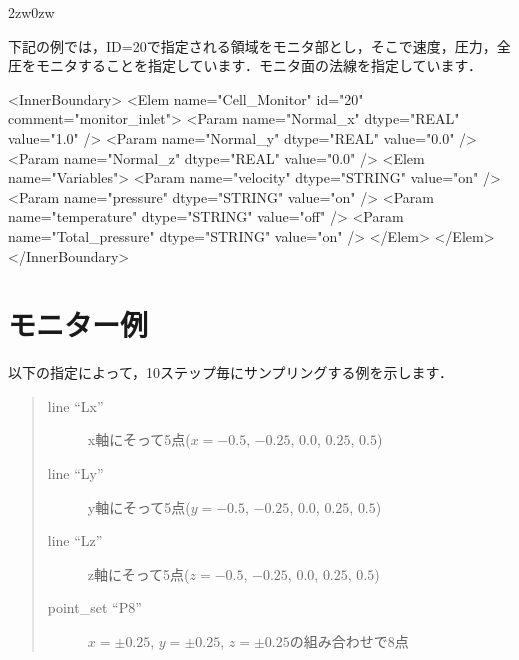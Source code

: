 \vspace{5mm}
\begin{indentation}{2zw}{0zw}

下記の例では，ID=20で指定される領域をモニタ部とし，そこで速度，圧力，全圧をモニタすることを指定しています．モニタ面の法線を指定しています．

{\small
\begin{program}
<InnerBoundary>
  <Elem name="Cell_Monitor" id="20" comment="monitor_inlet"> 
    <Param name="Normal_x" dtype="REAL" value="1.0" /> 
    <Param name="Normal_y" dtype="REAL" value="0.0" /> 
    <Param name="Normal_z" dtype="REAL" value="0.0" /> 
    <Elem name="Variables"> 
      <Param name="velocity"       dtype="STRING" value="on" /> 
      <Param name="pressure"       dtype="STRING" value="on" /> 
      <Param name="temperature"    dtype="STRING" value="off" /> 
      <Param name="Total_pressure" dtype="STRING" value="on" /> 
    </Elem> 
  </Elem>
</InnerBoundary>
\end{program}
}

\end{indentation}


\pagebreak
\section{モニター例}
以下の指定によって，10ステップ毎にサンプリングする例を示します．

\begin{quote}
\begin{description}
\item[line ``Lx'']  x軸にそって5点($x=-0.5$, $-0.25$, $0.0$, $0.25$, $0.5$)
\item[line ``Ly'']  y軸にそって5点($y=-0.5$, $-0.25$, $0.0$, $0.25$, $0.5$)
\item[line ``Lz'']  z軸にそって5点($z=-0.5$, $-0.25$, $0.0$, $0.25$, $0.5$)
\item[point\_set ``P8''] $x=\pm0.25$, $y=\pm0.25$, $z=\pm0.25$の組み合わせで8点
\end{description}
\end{quote}


